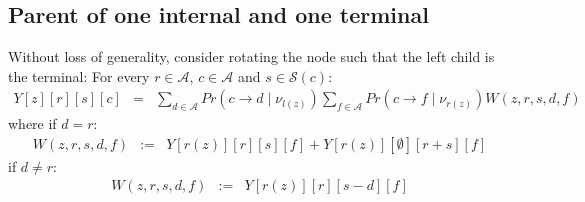 \documentclass[11pt]{article}
\begin{document}
\subsection{Parent of one internal and one terminal}
Without loss of generality, consider rotating the node such that 
the left child is the terminal:
For every $r\in \mathcal{A}$, $c\in \mathcal{A}$ and $s\in\mathcal{S}(c)$:
\begin{eqnarray*}
Y[z][r][s][c] & = & \sum_{d\in \mathcal{A}}Pr(c\rightarrow d\mid \nu_{l(z)})\sum_{f\in \mathcal{A}}Pr(c\rightarrow f\mid \nu_{r(z)}) W(z, r, s, d, f)
\end{eqnarray*}
where if $d = r$:
\begin{eqnarray*}
W(z, r, s, d, f) & := & Y[r(z)][r][s][f] + Y[r(z)][\emptyset][r + s][f]
\end{eqnarray*}
if $d \neq r$:
\begin{eqnarray*}
W(z, r, s, d, f) & := &Y[r(z)][r][s - d][f]
\end{eqnarray*}


\end{document}

